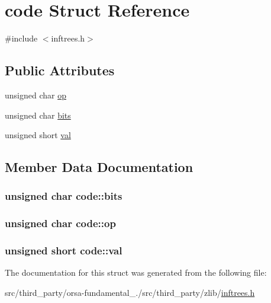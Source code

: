 \hypertarget{structcode}{}\section{code Struct Reference}
\label{structcode}


{\ttfamily \#include $<$inftrees.\+h$>$}

\subsection*{Public Attributes}
\begin{DoxyCompactItemize}
\item 
unsigned char \hyperlink{structcode_a4f075d73a9177d05cc7d332105295b83}{op}
\item 
unsigned char \hyperlink{structcode_a5defcebb356dca1a5a8d39995f28d66b}{bits}
\item 
unsigned short \hyperlink{structcode_a6f9c73627997e8fc6df02e620cf9a6f5}{val}
\end{DoxyCompactItemize}


\subsection{Member Data Documentation}
\hypertarget{structcode_a5defcebb356dca1a5a8d39995f28d66b}{}
\subsubsection[{bits}]{\setlength{\rightskip}{0pt plus 5cm}unsigned char code\+::bits}\label{structcode_a5defcebb356dca1a5a8d39995f28d66b}
\hypertarget{structcode_a4f075d73a9177d05cc7d332105295b83}{}
\subsubsection[{op}]{\setlength{\rightskip}{0pt plus 5cm}unsigned char code\+::op}\label{structcode_a4f075d73a9177d05cc7d332105295b83}
\hypertarget{structcode_a6f9c73627997e8fc6df02e620cf9a6f5}{}
\subsubsection[{val}]{\setlength{\rightskip}{0pt plus 5cm}unsigned short code\+::val}\label{structcode_a6f9c73627997e8fc6df02e620cf9a6f5}


The documentation for this struct was generated from the following file\+:\begin{DoxyCompactItemize}
\item 
src/third\+\_\+party/orsa-\/fundamental\+\_./src/third\+\_\+party/zlib/\hyperlink{inftrees_8h}{inftrees.\+h}\end{DoxyCompactItemize}

